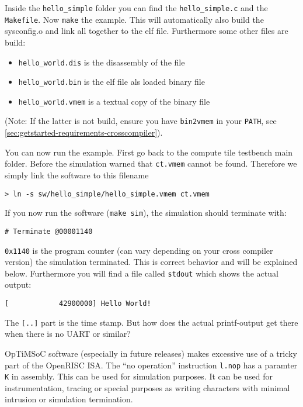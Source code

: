 Inside the \verb|hello_simple| folder you can find the
\verb|hello_simple.c| and the \verb|Makefile|. Now \verb|make| the
example. This will automatically also build the sysconfig.o and link
all together to the elf file. Furthermore some other files are build:

\begin{itemize}
\item \verb|hello_world.dis| is the disassembly of the file
\item \verb|hello_world.bin| is the elf file als loaded binary file
\item \verb|hello_world.vmem| is a textual copy of the binary file
\end{itemize}

(Note: If the latter is not build, ensure you have \verb|bin2vmem| in
your \verb|PATH|, see
\ref{sec:getstarted-requirements-crosscompiler}).

You can now run the example. First go back to the compute tile
testbench main folder. Before the simulation warned that
\verb|ct.vmem| cannot be found. Therefore we simply link the software
to this filename

\begin{verbatim}
> ln -s sw/hello_simple/hello_simple.vmem ct.vmem
\end{verbatim}

If you now run the software (\verb|make sim|), the simulation should
terminate with:

\begin{verbatim}
# Terminate @00001140
\end{verbatim}

\verb|0x1140| is the program counter (can vary depending on your cross
compiler version) the simulation terminated. This is correct behavior
and will be explained below. Furthermore you will find a file called
\verb|stdout| which shows the actual output:

\begin{verbatim}
[            42900000] Hello World!
\end{verbatim}

The \verb|[..]| part is the time stamp. But how does the actual
printf-output get there when there is no UART or similar?

OpTiMSoC software (especially in future releases) makes excessive use
of a tricky part of the OpenRISC ISA. The ``no operation'' instruction
\verb|l.nop| has a paramter \verb|K| in assembly. This can be used for
simulation purposes. It can be used for instrumentation, tracing or
special purposes as writing characters with minimal intrusion or
simulation termination.

